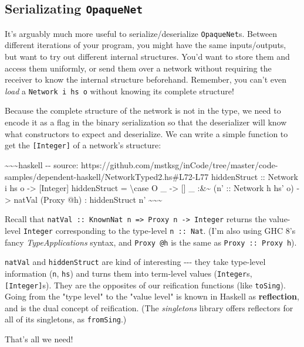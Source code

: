 \documentclass[]{article}
\begin{document}
\subsection{\texorpdfstring{Serializating
\texttt{OpaqueNet}}{Serializating OpaqueNet}}

It's arguably much more useful to serialize/deserialize \texttt{OpaqueNet}s.
Between different iterations of your program, you might have the same
inputs/outputs, but want to try out different internal structures. You'd want to
store them and access them uniformly, or send them over a network without
requiring the receiver to know the internal structure beforehand. Remember, you
can't even \emph{load} a \texttt{Network\ i\ hs\ o} without knowing its complete
structure!

Because the complete structure of the network is not in the type, we need to
encode it as a flag in the binary serialization so that the deserializer will
know what constructors to expect and deserialize. We can write a simple function
to get the \texttt{{[}Integer{]}} of a network's structure:

\textasciitilde{}\textasciitilde{}\textasciitilde{}haskell -\/- source:
https://github.com/mstksg/inCode/tree/master/code-samples/dependent-haskell/NetworkTyped2.hs\#L72-L77
hiddenStruct :: Network i hs o -\textgreater{} {[}Integer{]} hiddenStruct =
\textbackslash{}case O \_ -\textgreater{} {[}{]} \_ :\&\textasciitilde{} (n' ::
Network h hs' o) -\textgreater{} natVal (Proxy @h) : hiddenStruct n'
\textasciitilde{}\textasciitilde{}\textasciitilde{}

Recall that
\texttt{natVal\ ::\ KnownNat\ n\ =\textgreater{}\ Proxy\ n\ -\textgreater{}\ Integer}
returns the value-level \texttt{Integer} corresponding to the type-level
\texttt{n\ ::\ Nat}. (I'm also using GHC 8's fancy \emph{TypeApplications}
syntax, and \texttt{Proxy\ @h} is the same as \texttt{Proxy\ ::\ Proxy\ h}).

\texttt{natVal} and \texttt{hiddenStruct} are kind of interesting -\/-\/- they
take type-level information (\texttt{n}, \texttt{hs}) and turns them into
term-level values (\texttt{Integer}s, \texttt{{[}Integer{]}}s). They are the
opposites of our reification functions (like \texttt{toSing}). Going from the
"type level" to the "value level" is known in Haskell as \textbf{reflection},
and is the dual concept of reification. (The \emph{singletons} library offers
reflectors for all of its singletons, as \texttt{fromSing}.)

That's all we need!
\end{document}
